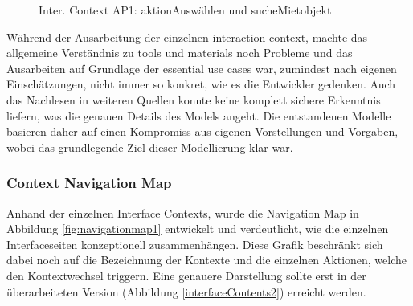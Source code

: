 \begin{figure}[H]
\centering
\hfill
{}
\hfill %
\hfill %
\caption{Inter. Context AP1: aktionAuswählen und sucheMietobjekt }
\label{interfaceContents1}
\end{figure}

Während der Ausarbeitung der einzelnen interaction context, machte das allgemeine Verständnis zu tools und materials noch Probleme und das Ausarbeiten auf Grundlage der essential use cases war, zumindest nach eigenen Einschätzungen, nicht immer so konkret, wie es die Entwickler gedenken. Auch das Nachlesen in weiteren Quellen konnte keine komplett sichere Erkenntnis liefern, was die genauen Details des Models angeht. Die entstandenen Modelle basieren daher auf einen Kompromiss aus eigenen Vorstellungen und Vorgaben, wobei das grundlegende Ziel dieser Modellierung klar war.

\newpage
\subsubsection{Context Navigation Map}
Anhand der einzelnen Interface Contexts, wurde die Navigation Map in Abbildung \ref{fig:navigationmap1} entwickelt und verdeutlicht, wie die einzelnen Interfaceseiten konzeptionell zusammenhängen. Diese Grafik beschränkt sich dabei noch auf die Bezeichnung der Kontexte und die einzelnen Aktionen, welche den Kontextwechsel triggern. Eine genauere Darstellung sollte erst in der überarbeiteten Version (Abbildung \ref{interfaceContents2}) erreicht werden.

